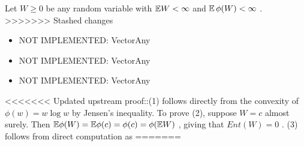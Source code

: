 \documentclass{article}
\begin{document}
\begin{theorem}
\label{Definition of entropy}
Let  $W\geq 0$  be any random variable with  $\mathbb{E} W < \infty$  and  $\mathbb{E}\, \phi(W)<\infty$ . 
>>>>>>> Stashed changes

\begin{itemize}
\item NOT IMPLEMENTED: Vector{Any}
\item NOT IMPLEMENTED: Vector{Any}
\item NOT IMPLEMENTED: Vector{Any}\end{itemize}
<<<<<<< Updated upstream
 proof::(1) follows directly from the convexity of  $\phi(w) = w \log w$  by Jensen's inequality. To prove (2), suppose  $W = c$  almost surely. Then  $\mathbb{E}\phi(W) = \mathbb{E} \phi(c) = \phi(c) = \phi(\mathbb{E} W)$ , giving that  $Ent(W)=0$ . (3) follows from direct computation as
=======

\end{theorem}
\end{document}
